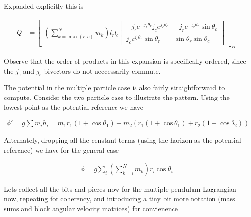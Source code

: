 Expanded explicitly this is

\begin{align}\label{eqn:sPolarMultiPendulum:zoo17}
Q &=
{\begin{bmatrix}
\left(\sum_{k=\max(r,c)}^N m_k \right) l_r l_c
\begin{bmatrix}
- j_r e^{-j_r \theta_r} j_c e^{j_c\theta_c} & - j_r e^{-j_r \theta_r} \sin\theta_c \\
j_c e^{j_c \theta_c} \sin\theta_r & \sin\theta_r \sin\theta_c
\end{bmatrix}
\end{bmatrix}}_{rc}
\end{align}

Observe that the order of products in this expansion is specifically ordered, since the $j_c$ and $j_r$ bivectors do not neccessarily commute.

The potential in the multiple particle case is also fairly straightforward to compute.  Consider the two particle case to illustrate the pattern.   Using the lowest point as the potential reference we have

\begin{align}\label{eqn:sPolarMultiPendulum:zoo18}
\phi' = g \sum m_i h_i
= m_1 r_1 (1 + \cos\theta_1) 
+ m_2 \left( r_1(1 + \cos\theta_1) + r_2( 1 + \cos\theta_2) \right)
\end{align}

Alternately, dropping all the constant terms (using the horizon as the potential reference) we have for the general case

\begin{align}\label{eqn:sPolarMultiPendulum:zoo19}
\phi = g \sum_i \left( \sum_{k=i}^N m_k \right) r_i \cos\theta_i
\end{align}

Lets collect all the bits and pieces now for the multiple pendulum Lagrangian now, repeating for coherency, and introducing a tiny bit more notation (mass sums and block angular velocity matrices) for convienence

